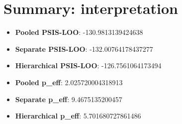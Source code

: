 \documentclass[11pt,a4paper,english]{article}
\begin{document}
      \section{Summary: interpretation}
        \begin{itemize}
          \item \textbf{Pooled PSIS-LOO}: -130.9813139424638
          \item \textbf{Separate PSIS-LOO}: -132.00764178437277
          \item \textbf{Hierarchical PSIS-LOO}: -126.7561064173494
          \item \textbf{Pooled p\_eff}: 2.025720004318913
          \item \textbf{Separate p\_eff}: 9.4675135200457
          \item \textbf{Hierarchical p\_eff}: 5.701680727861486
        \end{itemize}
\end{document}
